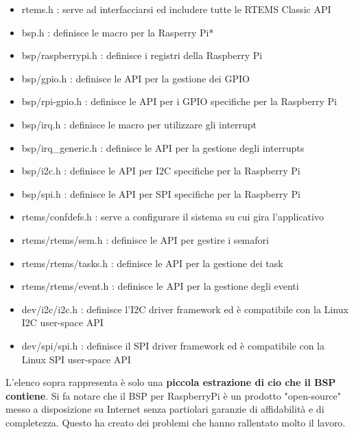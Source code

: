 \documentclass[12pt, a4paper, titlepage, oneside]{book}
\begin{document}
\begin{itemize}
    \item\parbox[t]{\linewidth}{ rtems.h : serve ad interfacciarsi ed includere tutte le RTEMS Classic API}
    \item\parbox[t]{\linewidth}{bsp.h : definisce le macro per la Rasperry Pi*}
    \item\parbox[t]{\linewidth}{bsp/raspberrypi.h : definisce i registri della Raspberry Pi}
    \item\parbox[t]{\linewidth}{bsp/gpio.h : definisce le API per la gestione dei GPIO}
    \item\parbox[t]{\linewidth}{bsp/rpi-gpio.h : definisce le API per i GPIO specifiche per la Raspberry Pi}
    \item\parbox[t]{\linewidth}{bsp/irq.h : definisce le macro per utilizzare gli interrupt}
    \item\parbox[t]{\linewidth}{bsp/irq\_generic.h : definisce le API per la gestione degli interrupts}
    \item\parbox[t]{\linewidth}{bsp/i2c.h : definisce le API per I2C specifiche per la Raspberry Pi}
    \item\parbox[t]{\linewidth}{bsp/spi.h : definisce le API per SPI specifiche per la Raspberry Pi}
    \item\parbox[t]{\linewidth}{rtems/confdefs.h : serve a configurare il sistema su cui gira l'applicativo}
    \item\parbox[t]{\linewidth}{rtems/rtems/sem.h : definisce le API per gestire i semafori}
    \item\parbox[t]{\linewidth}{rtems/rtems/tasks.h : definisce le API per la gestione dei task}
    \item\parbox[t]{\linewidth}{rtems/rtems/event.h : definisce le API per la gestione degli eventi}
    \item\parbox[t]{\linewidth}{ dev/i2c/i2c.h : definisce l'I2C driver framework ed è compatibile con la Linux I2C user-space API}
    \item\parbox[t]{\linewidth}{ dev/spi/spi.h :  definisce il SPI driver framework ed è compatibile con la Linux SPI user-space API}
\end{itemize}

L'elenco sopra rappresenta è solo una\textbf{ piccola estrazione di cio che il BSP contiene}.\newline
Si fa notare che il BSP per RaspberryPi è un prodotto "open-source" messo a disposizione su Internet senza partiolari garanzie di affidabilità e di completezza.\newline
Questo ha creato dei problemi che hanno rallentato molto il lavoro.\newline
\end{document}
